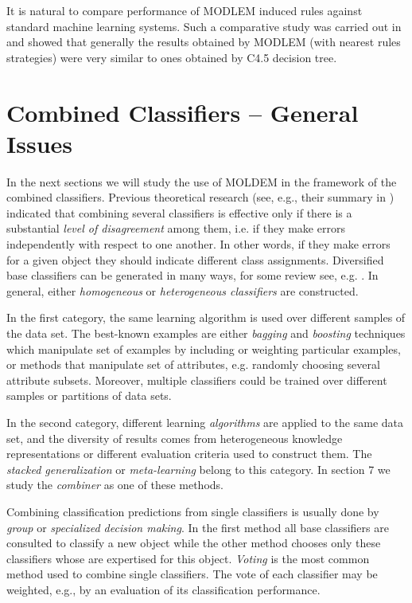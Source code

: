 \documentclass{llncs}
\begin{document}
It is natural to compare performance of MODLEM induced rules against
standard machine learning systems. Such a comparative study was carried out
in \cite{habcia,nowaczyk} and showed that generally the results obtained by
MODLEM (with nearest rules strategies) were very similar to ones obtained by
C4.5 decision tree.


\section{Combined Classifiers -- General Issues}

In the next sections we will study the use of MOLDEM in the framework of the
combined classifiers. Previous theoretical research (see, e.g., their
summary in \cite{Dietrich,Valentini}) indicated that combining several
classifiers is effective only if there is a substantial {\em level of
disagreement} among them, i.e. if they make errors independently with
respect to one another. In other words, if they make errors for a given
object they should indicate different class assignments. Diversified base
classifiers can be generated in many ways, for some review see, e.g.
\cite{Dietrich,Stef01,Valentini}. In general, either {\em homogeneous} or
{\em heterogeneous classifiers} are constructed.

In the first category, the same learning algorithm is used over different
samples of the data set. The best-known examples are either {\em bagging}
and  {\em boosting} techniques which manipulate set of examples by including
or weighting particular examples, or methods that manipulate set of
attributes, e.g. randomly choosing several attribute subsets. Moreover,
multiple classifiers could be trained over different samples or partitions
of data sets.

In the second category, different learning \emph{algorithms} are applied to
the same data set, and the diversity of results comes from heterogeneous
knowledge representations or different evaluation criteria used to construct
them. The \emph{stacked generalization} or \emph{meta-learning} belong to
this category. In section 7 we study the \emph{combiner} as one of these
methods.

Combining classification predictions from single classifiers is usually done
by {\em group} or {\em specialized decision making}. In the first method all
base classifiers are consulted to classify a new object while the other
method chooses only these classifiers whose are expertised for this object.
{\em Voting} is the most common method used to combine single classifiers.
The vote of each classifier may be weighted, e.g., by an evaluation of its
classification performance.
\end{document}
